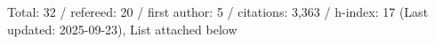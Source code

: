 Total: 32 / refereed: 20 / first author: 5 / citations: 3,363 / h-index: 17 (Last updated: 2025-09-23), List attached below